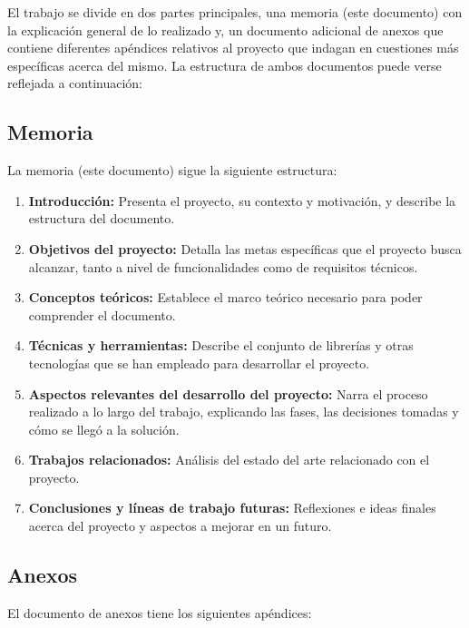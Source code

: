 El trabajo se divide en dos partes principales, una memoria (este documento) con la explicación general de lo realizado y, un documento adicional de anexos que contiene diferentes apéndices relativos al proyecto que indagan en cuestiones más específicas acerca del mismo. La estructura de ambos documentos puede verse reflejada a continuación:

\subsection{Memoria}

La memoria (este documento) sigue la siguiente estructura:

\begin{enumerate}
	\item \textbf{Introducción:} Presenta el proyecto, su contexto y motivación, y describe la estructura del documento.
	
	\item \textbf{Objetivos del proyecto:} Detalla las metas específicas que el proyecto busca alcanzar, tanto a nivel de funcionalidades como de requisitos técnicos.
	
	\item \textbf{Conceptos teóricos:} Establece el marco teórico necesario para poder comprender el documento.
	
	\item \textbf{Técnicas y herramientas:} Describe el conjunto de librerías y otras tecnologías que se han empleado para desarrollar el proyecto.
	
	\item \textbf{Aspectos relevantes del desarrollo del proyecto:} Narra el proceso realizado a lo largo del trabajo, explicando las fases, las decisiones tomadas y cómo se llegó a la solución.
	
	\item \textbf{Trabajos relacionados:} Análisis del estado del arte relacionado con el proyecto.
	
	\item \textbf{Conclusiones y líneas de trabajo futuras:} Reflexiones e ideas finales acerca del proyecto y aspectos a mejorar en un futuro.
\end{enumerate}

\subsection{Anexos}

El documento de anexos tiene los siguientes apéndices:

